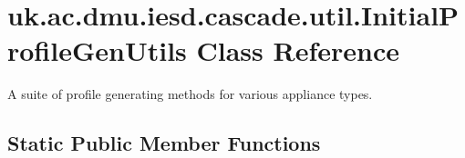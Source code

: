 \hypertarget{classuk_1_1ac_1_1dmu_1_1iesd_1_1cascade_1_1util_1_1_initial_profile_gen_utils}{\section{uk.\-ac.\-dmu.\-iesd.\-cascade.\-util.\-Initial\-Profile\-Gen\-Utils Class Reference}
\label{classuk_1_1ac_1_1dmu_1_1iesd_1_1cascade_1_1util_1_1_initial_profile_gen_utils}
}


A suite of profile generating methods for various appliance types.  


\subsection*{Static Public Member Functions}
